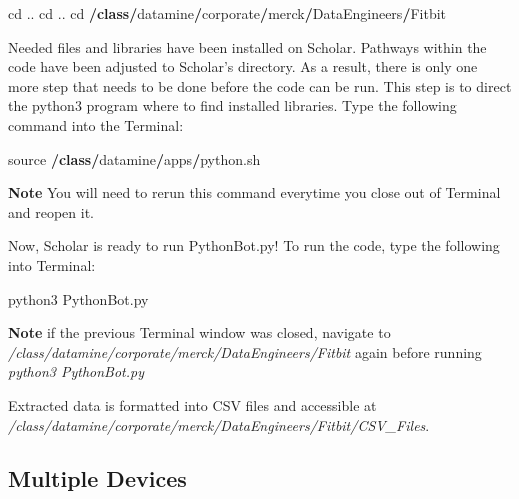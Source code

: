\documentclass[]{book}
\newenvironment{Shaded}{\begin{snugshade}}{\end{snugshade}}
\newcommand{\KeywordTok}[1]{\textcolor[rgb]{0.13,0.29,0.53}{\textbf{#1}}}
\newcommand{\OperatorTok}[1]{\textcolor[rgb]{0.81,0.36,0.00}{\textbf{#1}}}
\newcommand{\NormalTok}[1]{#1}
\begin{document}
\begin{Shaded}
\begin{Highlighting}[]
\NormalTok{cd ..}
\NormalTok{cd ..}
\NormalTok{cd }\OperatorTok{/}\KeywordTok{class}\OperatorTok{/}\NormalTok{datamine}\OperatorTok{/}\NormalTok{corporate}\OperatorTok{/}\NormalTok{merck}\OperatorTok{/}\NormalTok{DataEngineers}\OperatorTok{/}\NormalTok{Fitbit}
\end{Highlighting}
\end{Shaded}

Needed files and libraries have been installed on Scholar. Pathways
within the code have been adjusted to Scholar's directory. As a result,
there is only one more step that needs to be done before the code can be
run. This step is to direct the python3 program where to find installed
libraries. Type the following command into the Terminal:

\begin{Shaded}
\begin{Highlighting}[]
\NormalTok{source }\OperatorTok{/}\KeywordTok{class}\OperatorTok{/}\NormalTok{datamine}\OperatorTok{/}\NormalTok{apps}\OperatorTok{/}\NormalTok{python.sh}
\end{Highlighting}
\end{Shaded}

\textbf{Note} You will need to rerun this command everytime you close
out of Terminal and reopen it.

Now, Scholar is ready to run PythonBot.py! To run the code, type the
following into Terminal:

\begin{Shaded}
\begin{Highlighting}[]
\NormalTok{python3 PythonBot.py}
\end{Highlighting}
\end{Shaded}

\textbf{Note} if the previous Terminal window was closed, navigate to
\emph{/class/datamine/corporate/merck/DataEngineers/Fitbit} again before
running \emph{python3 PythonBot.py}

Extracted data is formatted into CSV files and accessible at
\emph{/class/datamine/corporate/merck/DataEngineers/Fitbit/CSV\_Files}.

\subsection{Multiple Devices}\label{multiple-devices}
\end{document}

